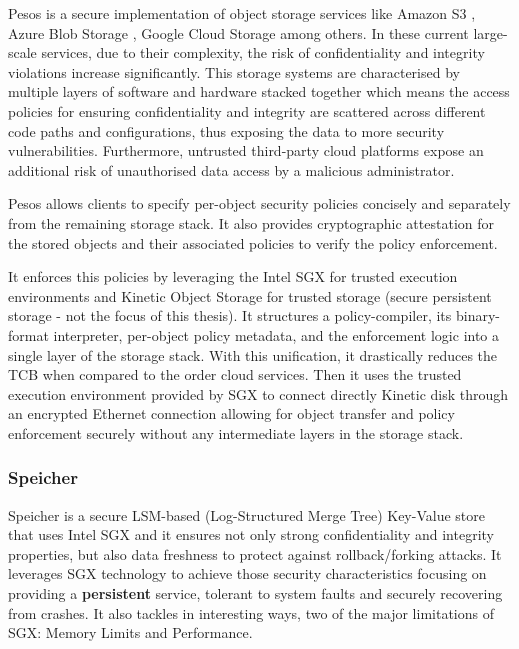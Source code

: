 Pesos \cite{pesos:1} is a secure implementation of object storage services like Amazon S3 \cite{s3:1}, Azure Blob Storage \cite{azureStorage:1}, Google Cloud Storage \cite{googleStorage:1} among others. In these current large-scale services, due to their complexity, the risk of confidentiality and integrity violations increase significantly. This storage systems are characterised by multiple layers of software and hardware stacked together which means the access policies for ensuring confidentiality and integrity are scattered across different code paths and configurations, thus exposing the data to more security vulnerabilities. Furthermore, untrusted third-party cloud platforms expose an additional risk of unauthorised data access by a malicious administrator.

Pesos allows clients to specify per-object security policies concisely and separately from the remaining storage stack. It also provides cryptographic attestation for the stored objects and their associated policies to verify the policy enforcement.

It enforces this policies by leveraging the Intel \gls{SGX} for trusted execution environments and Kinetic Object Storage \cite{kinetic:1} for trusted storage (secure persistent storage - not the focus of this thesis). It structures a policy-compiler, its binary-format interpreter, per-object policy metadata, and the enforcement logic into a single layer of the storage stack. With this unification, it drastically reduces the \gls{TCB} when compared to the order cloud services. Then it uses the trusted execution environment provided by \gls{SGX} to connect directly Kinetic disk through an encrypted Ethernet connection allowing for object transfer and policy enforcement securely without any intermediate layers in the storage stack.

\subsubsection{Speicher}
\label{sssec:speicher}

Speicher \cite{speicher:1} is a secure \gls{LSM}-based (Log-Structured Merge Tree) Key-Value store that uses Intel \gls{SGX} and it ensures not only strong confidentiality and integrity properties, but also data freshness to protect against rollback/forking attacks. It leverages \gls{SGX} technology to achieve those security characteristics focusing on providing a \textbf{persistent} service, tolerant to system faults and securely recovering from crashes. It also tackles in interesting ways, two of the major limitations of \gls{SGX}: Memory Limits and Performance.

